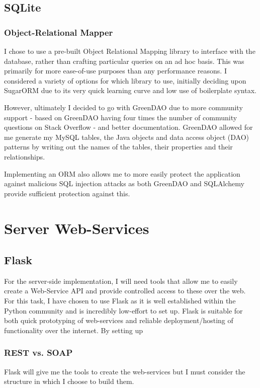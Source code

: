 \subsection{SQLite}

\subsubsection{Object-Relational Mapper}
I chose to use a pre-built Object Relational Mapping library to interface with the database, rather than crafting particular queries on an ad hoc basis. 
This was primarily for more ease-of-use purposes than any performance reasons. 
I considered a variety of options for which library to use, initially deciding upon SugarORM due to its very quick learning curve and low use of boilerplate syntax. 

However, ultimately I decided to go with GreenDAO due to more community support - based on GreenDAO having four times the number of community questions on Stack Overflow - and better documentation.
GreenDAO allowed for me generate my MySQL tables, the Java objects and data access object (DAO) patterns by writing out the names of the tables, their properties and their relationships. 


Implementing an ORM also allows me to more easily protect the application against malicious SQL injection attacks as both GreenDAO and SQLAlchemy provide sufficient protection against this. 


\section{Server Web-Services}
\subsection{Flask}
For the server-side implementation, I will need tools that allow me to easily create a Web-Service API and provide controlled access to these over the web.
For this task, I have chosen to use Flask as it is well established within the Python community and is incredibly low-effort to set up. 
Flask is suitable for both quick prototyping of web-services and reliable deployment/hosting of functionality over the internet.
By setting up 

\subsubsection{REST vs. SOAP}
Flask will give me the tools to create the web-services but I must consider the structure in which I choose to build them. 

